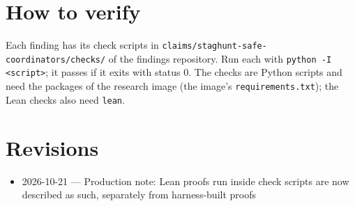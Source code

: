 \documentclass{article}
\begin{document}
\section{How to verify}

Each finding has its check scripts in \texttt{claims/staghunt-safe-coordinators/checks/} of the findings repository. Run each with \texttt{python -I <script>}; it passes if it exits with status 0. The checks are Python scripts and need the packages of the research image (the image's \texttt{requirements.txt}); the Lean checks also need \texttt{lean}.

\section{Revisions}

\begin{itemize}
\item 2026-10-21 --- Production note: Lean proofs run inside check scripts are now described as such, separately from harness-built proofs
\end{itemize}



\end{document}
